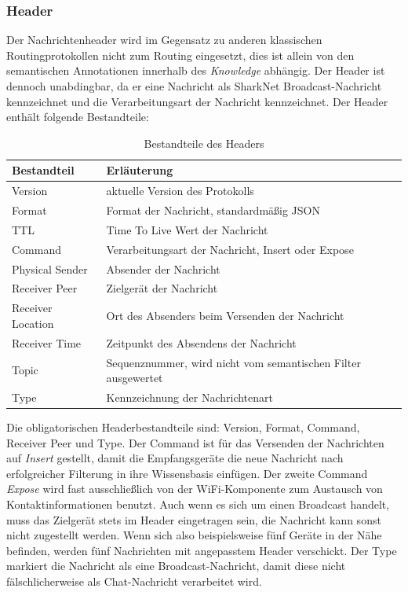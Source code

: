 \subsubsection{Header}
Der Nachrichtenheader wird im Gegensatz zu anderen klassischen Routingprotokollen nicht zum Routing eingesetzt, dies ist allein von den semantischen Annotationen innerhalb des \textit{Knowledge} abhängig. Der Header ist dennoch unabdingbar, da er eine Nachricht als SharkNet Broadcast-Nachricht kennzeichnet und die Verarbeitungsart der Nachricht kennzeichnet. Der Header enthält folgende Bestandteile:
\begin{table}[H]
	\begin{center}
		\caption{Bestandteile des Headers}
		\label{tab:messageHeader}
		\begin{tabular}{l|l} 			
			Bestandteil & Erläuterung \\
			\hline
			Version & aktuelle Version des Protokolls\\
			Format & Format der Nachricht, standardmäßig JSON\\
			TTL & Time To Live Wert der Nachricht\\
			Command & Verarbeitungsart der Nachricht, Insert oder Expose\\
			Physical Sender & Absender der Nachricht\\
			Receiver Peer & Zielgerät der Nachricht\\
			Receiver Location & Ort des Absenders beim Versenden der Nachricht\\
			Receiver Time & Zeitpunkt des Absendens der Nachricht\\
			Topic & Sequenznummer, wird nicht vom semantischen Filter ausgewertet\\
			Type & Kennzeichnung der Nachrichtenart\\							
		\end{tabular}
	\end{center}
\end{table}
Die obligatorischen Headerbestandteile sind: Version, Format, Command, Receiver Peer und Type. Der Command ist für das Versenden der Nachrichten auf \textit{Insert} gestellt, damit die Empfangsgeräte die neue Nachricht nach erfolgreicher Filterung in ihre Wissensbasis einfügen. Der zweite Command \textit{Expose} wird fast ausschließlich von der WiFi-Komponente zum Austausch von Kontaktinformationen benutzt. Auch wenn es sich um einen Broadcast handelt, muss das Zielgerät stets im Header eingetragen sein, die Nachricht kann sonst nicht zugestellt werden. Wenn sich also beispielsweise fünf Geräte in der Nähe befinden, werden fünf Nachrichten mit angepasstem Header verschickt. Der Type markiert die Nachricht als eine Broadcast-Nachricht, damit diese nicht fälschlicherweise als Chat-Nachricht verarbeitet wird.
